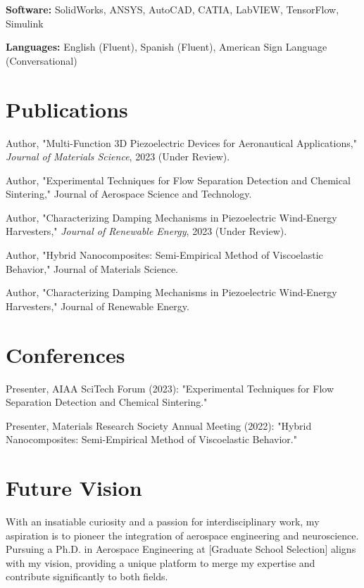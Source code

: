 \documentclass[letterpaper,10pt]{article}
\begin{document}
\textbf{Software:} SolidWorks, ANSYS, AutoCAD, CATIA, LabVIEW, TensorFlow, Simulink

\textbf{Languages:} English (Fluent), Spanish (Fluent), American Sign Language (Conversational)


\section*{Publications}
\begin{enumerate}[label={[\arabic*]}]
    \item Author, "Multi-Function 3D Piezoelectric Devices for Aeronautical Applications," \textit{Journal of Materials Science}, 2023 (Under Review).
    \item Author, "Experimental Techniques for Flow Separation Detection and Chemical Sintering," Journal of Aerospace Science and Technology.
     \item Author, "Characterizing Damping Mechanisms in Piezoelectric Wind-Energy Harvesters," \textit{Journal of Renewable Energy}, 2023 (Under Review).
    \item Author, "Hybrid Nanocomposites: Semi-Empirical Method of Viscoelastic Behavior," Journal of Materials Science.
    \item Author, "Characterizing Damping Mechanisms in Piezoelectric Wind-Energy Harvesters," Journal of Renewable Energy.
\end{enumerate}

\section*{Conferences}
\begin{enumerate}[label={[\arabic*]}]
    \item Presenter, AIAA SciTech Forum (2023): "Experimental Techniques for Flow Separation Detection and Chemical Sintering."
    \item Presenter, Materials Research Society Annual Meeting (2022): "Hybrid Nanocomposites: Semi-Empirical Method of Viscoelastic Behavior."
\end{enumerate}
\section*{Future Vision}
With an insatiable curiosity and a passion for interdisciplinary work, my aspiration is to pioneer the integration of aerospace engineering and neuroscience. Pursuing a Ph.D. in Aerospace Engineering at [Graduate School Selection] aligns with my vision, providing a unique platform to merge my expertise and contribute significantly to both fields.
\end{document}
